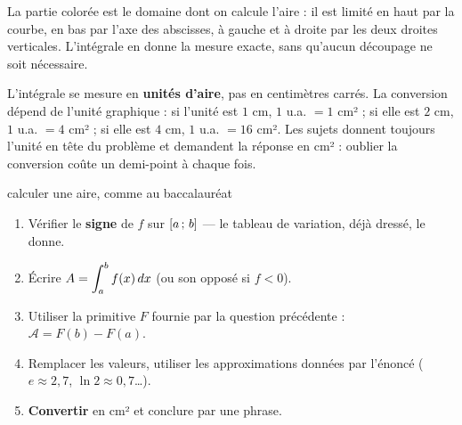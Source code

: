 \begin{visualisation}
\begin{center}
\end{center}

La partie colorée est le domaine dont on calcule l'aire : il est limité en
haut par la courbe, en bas par l'axe des abscisses, à gauche et à droite par
les deux droites verticales. L'intégrale en donne la mesure exacte, sans
qu'aucun découpage ne soit nécessaire.
\end{visualisation}

\begin{avertissement}
L'intégrale se mesure en \textbf{unités d'aire}, pas en centimètres carrés.
La conversion dépend de l'unité graphique : si l'unité est $1$ cm,
$1$ u.a. $= 1$ cm² ; si elle est $2$ cm, $1$ u.a. $= 4$ cm² ; si elle est
$4$ cm, $1$ u.a. $= 16$ cm². Les sujets donnent toujours l'unité en tête du
problème et demandent la réponse en cm² : oublier la conversion coûte un
demi-point à chaque fois.
\end{avertissement}

\begin{methode}{calculer une aire, comme au baccalauréat}
\begin{enumerate}[label=\textbf{\arabic*.}, leftmargin=*, itemsep=0.15em]
  \item Vérifier le \textbf{signe} de $f$ sur $\left[a\,;\,b\right]$ — le
        tableau de variation, déjà dressé, le donne.
  \item Écrire $A = \displaystyle\int_{a}^{b} f(x)\,dx$ (ou son
        opposé si $f<0$).
  \item Utiliser la primitive $F$ fournie par la question précédente :
        $\mathcal A = F(b)-F(a)$.
  \item Remplacer les valeurs, utiliser les approximations données par
        l'énoncé ($e \approx 2{,}7$, $\ln2 \approx 0{,}7$…).
  \item \textbf{Convertir} en cm² et conclure par une phrase.
\end{enumerate}
\end{methode}

